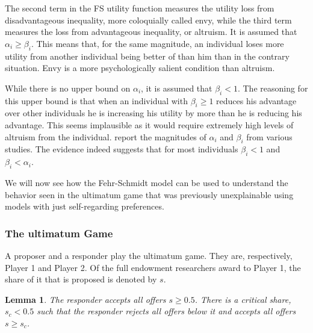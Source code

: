 \documentclass[12pt]{article}
\newtheorem{lemma}[theorem]{Lemma}
\begin{document}
The second term in the FS utility function measures the utility loss from disadvantageous inequality, more coloquially called envy, while the third term measures the loss from advantageous inequality, or altruism. It is assumed that $\alpha_i \geq \beta_i$. This means that, for the same magnitude, an individual loses more utility from another individual being better of than him than in the contrary situation. Envy is a more psychologically salient condition than altruism.

While there is no upper bound on $\alpha_i$, it is assumed that $\beta_i <1$. The reasoning for this upper bound is that when an individual with $\beta_i \geq 1$ reduces his advantage over other individuals he is increasing his utility by more than he is reducing his advantage. This seems implausible as it would require extremely high levels of altruism from the individual. \cite{Eckel2010} report the magnitudes of $\alpha_i$ and $\beta_i$ from various studies. The evidence indeed suggests that for most individuals $\beta_i <1$ and $\beta_i <\alpha_i$.



We will now see how the Fehr-Schmidt model can be used to understand the behavior seen in the ultimatum game that was previously unexplainable using models with just self-regarding preferences.

\subsubsection{The ultimatum Game}

A proposer and a responder play the ultimatum game. They are, respectively, Player 1 and Player 2. Of the full endowment researchers award to Player 1, the share of it that is proposed is denoted by $s$.

\begin{lemma}
	The responder accepts all offers $s \geq 0.5$. There is a critical share, $s_c < 0.5$ such that the responder rejects all offers below it and accepts all offers $s \geq s_c$.
\end{lemma}
\end{document}
